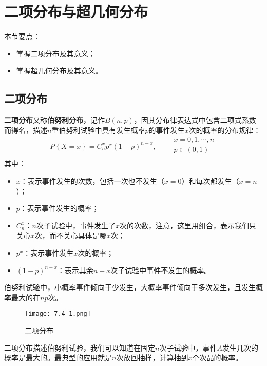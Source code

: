 \section{二项分布与超几何分布}

本节要点：
\begin{itemize}
    \item 掌握二项分布及其意义；
    \item 掌握超几何分布及其意义。
\end{itemize}

\subsection{二项分布}

{\bf 二项分布}又称{\bf 伯努利分布}，记作$B\left( n,p \right) $，因其分布律表达式中包含二项式系数而得名，描述$n$重伯努利试验中具有发生概率$p$的事件发生$x$次的概率的分布规律：
\[
P\left\{ X=x \right\} =C_{n}^{x}p^x\left( 1-p \right) ^{n-x},\qquad \begin{array}{l}
	x=0,1,\cdots ,n\\
	p\in \left( 0,1 \right)\\
\end{array}
\]
其中：
\begin{itemize}
    \item $x$：表示事件发生的次数，包括一次也不发生（$x=0$）和每次都发生（$x=n$）；
    \item $p$：表示事件发生的概率；
    \item $C_{n}^{x}$：$n$次子试验中，事件发生了$x$次的次数，注意，这里用组合，表示我们只关心$x$次，而不关心具体是哪$x$次；
    \item $p^x$：表示事件发生$x$次的概率；
    \item $\left( 1-p \right) ^{n-x}$：表示其余$n-x$次子试验中事件不发生的概率。
\end{itemize}
伯努利试验中，小概率事件倾向于少发生，大概率事件倾向于多次发生，且发生概率最大的在$np$次。

\begin{figure}[h]
\centering
\texttt{[image: 7.4-1.png]}
\caption{二项分布}
\end{figure}

\begin{tcolorbox}
二项分布描述伯努利试验，我们可以知道在固定$n$次子试验中，事件$A$发生几次的概率是最大的。最典型的应用就是$n$次放回抽样，计算抽到$x$个次品的概率。
\end{tcolorbox}

